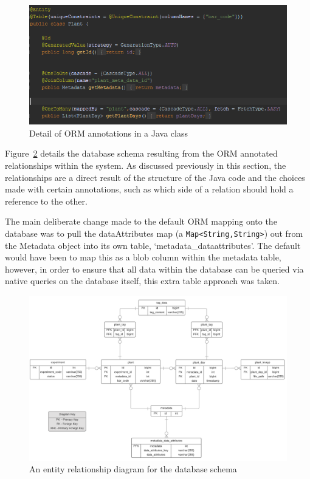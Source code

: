 \begin{figure}[H]
    \centering
    \includegraphics[width=\textwidth]{images/design/orm}
    \caption{Detail of ORM annotations in a Java class}
    \label{fig:orm}
\end{figure}


Figure~\ref{fig:dbSchema} details the database schema resulting from the ORM annotated relationships within the system. As discussed previously in this section, the relationships are a direct result of the structure of the Java code and the choices made with certain annotations, such as which side of a relation should hold a reference to the other.

 The main deliberate change made to the default ORM mapping onto the database was to pull the dataAttributes map (a \texttt{Map<String,String>}) out from the Metadata object into its own table, `metadata\_dataattributes'. The default would have been to map this as a blob column within the metadata table, however, in order to ensure that all data within the database can be queried via native queries on the database itself, this extra table approach was taken.


\begin{figure}[H]
    \centering
    \includegraphics[width=\textwidth]{images/design/dbSchema}
    \caption{An entity relationship diagram for the database schema}
    \label{fig:dbSchema}
\end{figure}


